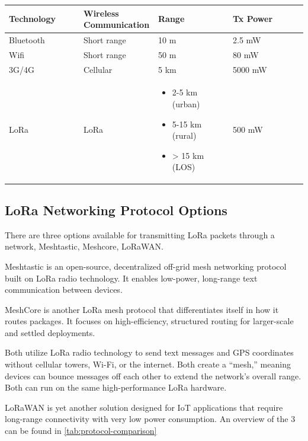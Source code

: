 \begin{tabular}{p{0.25\linewidth}p{0.25\linewidth}p{0.25\linewidth}p{0.25\linewidth}@{}}
\bfseries Technology & Wireless Communication  & Range & Tx Power\\
\toprule
    Bluetooth & Short range & 10 m & 2.5 mW \\
    Wifi & Short range & 50 m & 80 mW \\
    3G/4G & Cellular & 5 km & 5000 mW \\
    LoRa & LoRa & 
    \begin{itemize}
        \item 2-5 km (urban) 
        \item 5-15 km (rural)
        \item > 15 km (LOS)
    \end{itemize}
    & 500 mW 
\end{tabular}
\pagebreak


\subsection{LoRa Networking Protocol Options}
There are three options available for transmitting LoRa packets through a network, Meshtastic, Meshcore, LoRaWAN. 

Meshtastic is an open-source, decentralized off-grid mesh networking protocol built on LoRa radio technology. It enables low-power, long-range text communication between devices.

MeshCore is another LoRa mesh protocol that differentiates itself in how it routes packages. It focuses on high-efficiency, structured routing for larger-scale and settled deployments.

Both utilize LoRa radio technology to send text messages and GPS coordinates without cellular towers, Wi-Fi, or the internet. Both create a “mesh,” meaning devices can bounce messages off each other to extend the network’s overall range. Both can run on the same high-performance LoRa hardware.

LoRaWAN is yet another solution designed for IoT applications that require long-range connectivity with very low power consumption. An overview of the 3 can be found in \ref{tab:protocol-comparison}


